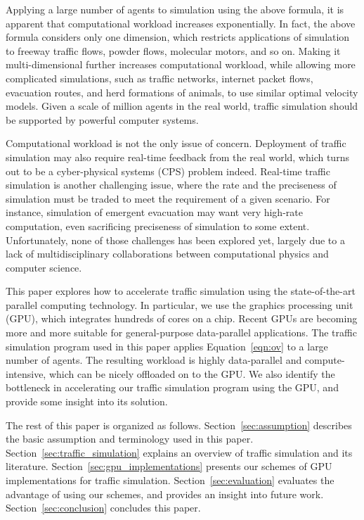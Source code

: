 \documentclass[times, 10pt, twocolumn]{article}
\begin{document}
Applying a large number of agents to simulation using the above formula,
it is apparent that computational workload increases exponentially.
In fact, the above formula considers only one dimension, which restricts
applications of simulation to freeway traffic flows, powder flows,
molecular motors, and so on.
Making it multi-dimensional further increases computational workload,
while allowing more complicated simulations, such as traffic networks,
internet packet flows, evacuation routes, and herd formations of
animals, to use similar optimal velocity models.
Given a scale of million agents in the real world, traffic
simulation should be supported by powerful computer systems.

Computational workload is not the only issue of concern.
Deployment of traffic simulation may also require real-time feedback
from the real world, which turns out to be a cyber-physical systems
(CPS) problem indeed.
Real-time traffic simulation is another challenging issue, where
the rate and the preciseness of simulation must be traded to meet the
requirement of a given scenario.
For instance, simulation of emergent evacuation may want very high-rate
computation, even sacrificing preciseness of simulation to some extent.
Unfortunately, none of those challenges has been explored yet, largely
due to a lack of multidisciplinary collaborations between computational
physics and computer science.

This paper explores how to accelerate traffic simulation using the
state-of-the-art parallel computing technology.
In particular, we use the graphics processing unit (GPU), which
integrates hundreds of cores on a chip.
Recent GPUs are becoming more and more suitable for general-purpose
data-parallel applications.
The traffic simulation program used in this paper applies
Equation~\eqref{eqn:ov} to a large number of agents.
The resulting workload is highly data-parallel and compute-intensive,
which can be nicely offloaded on to the GPU.
We also identify the bottleneck in accelerating our traffic simulation
program using the GPU, and provide some insight into its solution.

The rest of this paper is organized as follows.
Section~\ref{sec:assumption} describes the basic assumption and
terminology used in this paper.
Section~\ref{sec:traffic_simulation} explains an overview of
traffic simulation and its literature.
Section~\ref{sec:gpu_implementations} presents our schemes of GPU
implementations for traffic simulation.
Section~\ref{sec:evaluation} evaluates the advantage of using our
schemes, and provides an insight into future work.
Section~\ref{sec:conclusion} concludes this paper.
\end{document}
